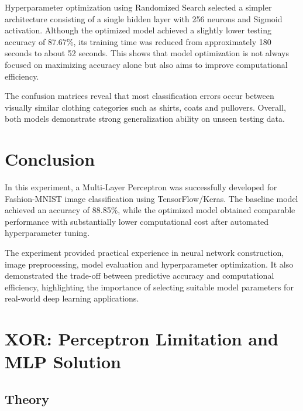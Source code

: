 \documentclass[12pt,a4paper]{article}
\begin{document}
Hyperparameter optimization using Randomized Search selected a simpler architecture consisting of a single hidden layer with 256 neurons and Sigmoid activation. Although the optimized model achieved a slightly lower testing accuracy of 87.67\%, its training time was reduced from approximately 180 seconds to about 52 seconds. This shows that model optimization is not always focused on maximizing accuracy alone but also aims to improve computational efficiency.

The confusion matrices reveal that most classification errors occur between visually similar clothing categories such as shirts, coats and pullovers. Overall, both models demonstrate strong generalization ability on unseen testing data.

\section{Conclusion}

In this experiment, a Multi-Layer Perceptron was successfully developed for Fashion-MNIST image classification using TensorFlow/Keras. The baseline model achieved an accuracy of 88.85\%, while the optimized model obtained comparable performance with substantially lower computational cost after automated hyperparameter tuning.

The experiment provided practical experience in neural network construction, image preprocessing, model evaluation and hyperparameter optimization. It also demonstrated the trade-off between predictive accuracy and computational efficiency, highlighting the importance of selecting suitable model parameters for real-world deep learning applications.


\section{XOR: Perceptron Limitation and MLP Solution}

\subsection{Theory}
\end{document}
